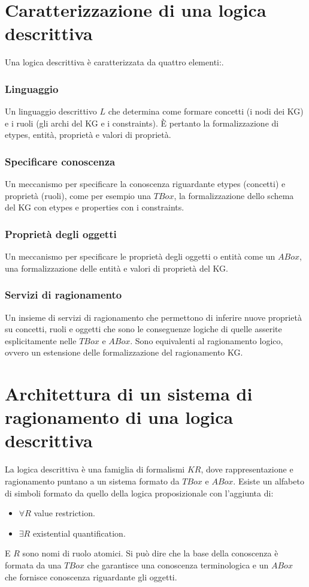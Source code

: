 \section{Caratterizzazione di una logica descrittiva}
Una logica descrittiva \`e caratterizzata da quattro elementi:.
\subsubsection{Linguaggio}
Un linguaggio descrittivo $L$ che determina come formare concetti (i nodi dei KG) e i ruoli (gli archi del KG e i constraints). \`E pertanto la formalizzazione di etypes, entit\`a, propriet\`a e valori di propriet\`a.
\subsubsection{Specificare conoscenza}
Un meccanismo per specificare la conoscenza riguardante etypes (concetti) e propriet\`a (ruoli), come per esempio una $TBox$, la formalizzazione dello schema del KG con etypes e properties con i constraints.
\subsubsection{Propriet\`a degli oggetti}
Un meccanismo per specificare le propriet\`a degli oggetti o entit\`a come un $ABox$, una formalizzazione delle entit\`a e valori di propriet\`a del KG.
\subsubsection{Servizi di ragionamento}
Un insieme di servizi di ragionamento che permettono di inferire nuove propriet\`a su concetti, ruoli e oggetti che sono le conseguenze logiche di quelle asserite esplicitamente nelle $TBox$ e $ABox$. Sono 
equivalenti al ragionamento logico, ovvero un estensione delle formalizzazione del ragionamento KG.
\section{Architettura di un sistema di ragionamento di una logica descrittiva}
La logica descrittiva \`e una famiglia di formalismi $KR$, dove rappresentazione e ragionamento puntano a un sistema formato da $TBox$ e $ABox$. Esiste un alfabeto di simboli formato da 	quello della 
logica proposizionale con l'aggiunta di:
\begin{itemize}
\item $\forall R$ value restriction.
\item $\exists R$ existential quantification.
\end{itemize}
E $R$ sono nomi di ruolo atomici. Si pu\`o dire che la base della conoscenza \`e formata da una $TBox$ che garantisce una conoscenza terminologica e un $ABox$ che fornisce conoscenza riguardante gli 
oggetti.
